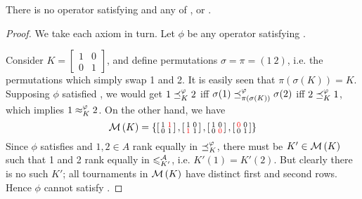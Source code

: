 \begin{theorem}
    \label{tourn_result_chainmin_axiom_incompatibilities}

    There is no operator satisfying  and any of
    ,  or .

\end{theorem}

\begin{proof}

    We take each axiom in turn. Let $\phi$ be any operator satisfying
    .

     Consider $K = \left[\begin{smallmatrix} 1&0\\0&1
    \end{smallmatrix}\right]$, and define permutations $\sigma = \pi = (1\ 2)$,
    i.e. the permutations which simply swap 1 and 2. It is easily seen that
    $\pi(\sigma(K)) = K$. Supposing $\phi$ satisfied , we would
    get $1 \preceq_K^\varphi 2$ iff $\sigma(1) \preceq_{\pi(\sigma(K))}^\varphi \sigma(2)$
    iff $2 \preceq_K^\varphi 1$, which implies $1 \approx_K^\varphi 2$.
    On the other hand, we have
    \[
        \operatorname{\mathcal{M}}\left({K}\right) = \left\{
           \left[\begin{smallmatrix}
               1 & \color{red}{1} \\
               0 & 1
           \end{smallmatrix}\right],
           \left[\begin{smallmatrix}
               1 & 0 \\
               \color{red}{1} & 1
           \end{smallmatrix}\right],
           \left[\begin{smallmatrix}
               1 & 0 \\
               0 & \color{red}{0}
           \end{smallmatrix}\right],
           \left[\begin{smallmatrix}
               \color{red}{0} & 0 \\
               0 & 1
           \end{smallmatrix}\right]
        \right\}
    \]
    Since $\phi$ satisfies  and $1, 2 \in A$ rank equally
    in ${\preceq_K^\varphi}$, there must be $K' \in \operatorname{\mathcal{M}}\left({K}\right)$ such that 1 and 2 rank
    equally in ${\leqslant^{\mathcal{A}}_{K'}}$, i.e. $K'(1) = K'(2)$. But clearly there is no
    such $K'$; all tournaments in $\operatorname{\mathcal{M}}\left({K}\right)$ have distinct first and second
    rows. Hence $\phi$ cannot satisfy .


\end{proof}
